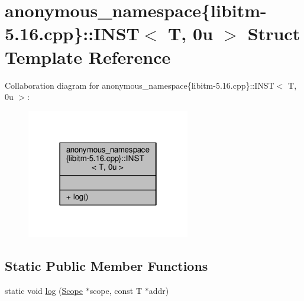\hypertarget{structanonymous__namespace_02libitm-5_816_8cpp_03_1_1INST_3_01T_00_010u_01_4}{\section{anonymous\-\_\-namespace\{libitm-\/5.16.cpp\}\-:\-:I\-N\-S\-T$<$ T, 0u $>$ Struct Template Reference}
\label{structanonymous__namespace_02libitm-5_816_8cpp_03_1_1INST_3_01T_00_010u_01_4}
}


Collaboration diagram for anonymous\-\_\-namespace\{libitm-\/5.16.cpp\}\-:\-:I\-N\-S\-T$<$ T, 0u $>$\-:
\nopagebreak
\begin{figure}[H]
\begin{center}
\leavevmode
\includegraphics[width=202pt]{structanonymous__namespace_02libitm-5_816_8cpp_03_1_1INST_3_01T_00_010u_01_4__coll__graph}
\end{center}
\end{figure}
\subsection*{Static Public Member Functions}
\begin{DoxyCompactItemize}
\item 
static void \hyperlink{structanonymous__namespace_02libitm-5_816_8cpp_03_1_1INST_3_01T_00_010u_01_4_abea2c844c65aedec91fedc5b0dd5e506}{log} (\hyperlink{classitm2stm_1_1Scope}{Scope} $\ast$scope, const T $\ast$addr)
\end{DoxyCompactItemize}


